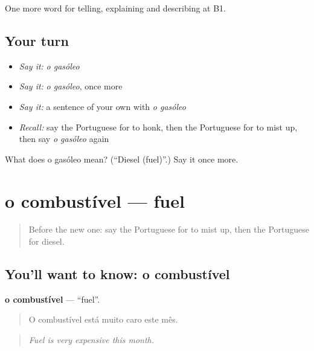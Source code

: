 \begin{grammarlens}[title={What you've built}]
One more word for telling, explaining and describing at B1.
\end{grammarlens}

\subsection*{Your turn}
\begin{itemize}
\raggedright
  \item \emph{Say it:} \emph{o gasóleo}
  \item \emph{Say it:} \emph{o gasóleo}, once more
  \item \emph{Say it:} a sentence of your own with \emph{o gasóleo}
  \item \emph{Recall:} say the Portuguese for to honk, then the Portuguese for to mist up, then say \emph{o gasóleo} again
\end{itemize}

\begin{tcolorbox}[breakable,colback=teal!4,colframe=teal!35!black,title={Before you move on}]
What does o gasóleo mean? (\textquotedblleft{}Diesel (fuel)\textquotedblright{}.) Say it once more.
\end{tcolorbox}
\section[o combustível]{o combustível — fuel}

\label{lesson:PT-C404-combustivel}



\begin{quote}
Before the new one: say the Portuguese for to mist up, then the Portuguese for diesel.
\end{quote}

\subsection*{You'll want to know: o combustível}
\textbf{o combustível} — \textquotedblleft{}fuel\textquotedblright{}.

\begin{quote}
O combustível está muito caro este mês.
\end{quote}

\begin{quote}
\emph{Fuel is very expensive this month.}
\end{quote}

